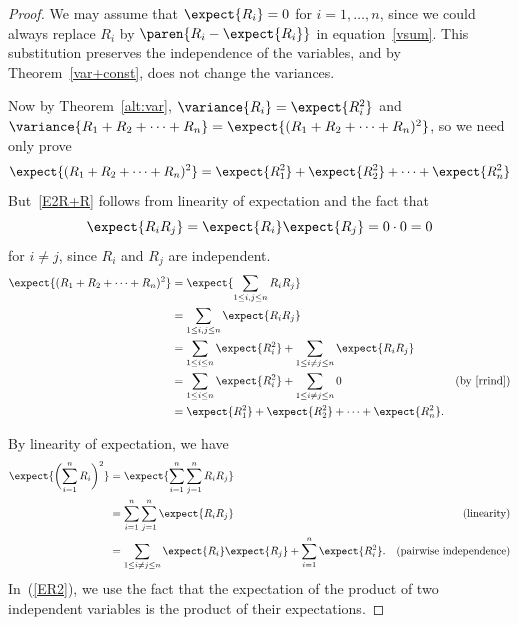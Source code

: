 \begin{proof}
We may assume that $\expect{R_i} = 0$ for $i=1,\dots,n$, since we could
always replace $R_i$ by $\paren{R_i-\expect{R_i}}$ in
equation~\eqref{vsum}.  This substitution preserves the independence of
the variables, and by Theorem~\ref{var+const}, does not change the
variances.

Now by Theorem~\ref{alt:var}, $\variance{R_i} = \expect{R_i^2}$ and
$\variance{R_1+R_2+\cdots+R_n} = \expect{(R_1+R_2+\cdots+R_n)^2}$, so we
need only prove
\begin{equation}\label{E2R+R}
\expect{(R_1+R_2+\cdots+R_n)^2} = \expect{R_1^2} + \expect{R_2^2} + \cdots
+ \expect{R_n^2}
\end{equation}
But~\eqref{E2R+R} follows from linearity of expectation and the fact that
\begin{equation}\label{rrind}
\expect{R_iR_j} = \expect{R_i}\expect{R_j} = 0 \cdot 0 = 0
\end{equation}
for $i \neq j$, since $R_i$ and $R_j$ are independent.
\begin{align*}
\expect{(R_1+R_2+\cdots+R_n)^2}
   & = \expect{\sum_{1\leq i,j \leq n} R_iR_j}\\
   & = \sum_{1\leq i,j \leq n} \expect{R_iR_j}\\
   & = \sum_{1 \leq i \leq n} \expect{R_i^2}
             + \sum_{1 \leq i \neq j \leq n} \expect{R_iR_j}\\
   & = \sum_{1 \leq i \leq n} \expect{R_i^2}
            + \sum_{1 \leq i \neq j \leq n} 0 
             & \text{(by~\eqref{rrind})}\\
   & =  \expect{R_1^2} + \expect{R_2^2} + \cdots + \expect{R_n^2}.
\end{align*}

\iffalse
By linearity of expectation, we have
\begin{align}
\expect{\biggl(\sum_{i=1}^n R_i\biggr)^2} &
    = \expect{\sum_{i=1}^n \sum_{j=1}^n R_i R_j} \notag\\
   &  = \sum_{i=1}^n \sum_{j=1}^n \expect{R_i R_j} & \text{(linearity)}\notag\\
   & = \sum_{1\le i \neq j \le n} \expect{R_i}\expect{R_j} + \sum_{i=1}^n
     \expect{R_i^2}.
       & \text{(pairwise independence)} \label{ER2}
\end{align}
In~(\ref{ER2}), we use the fact that the expectation
of the product of two independent variables is the product of their
expectations.


\end{proof}
